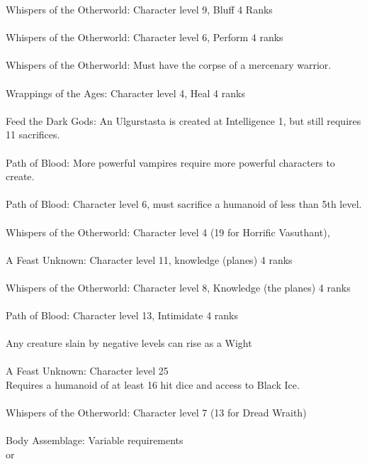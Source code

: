 \begin{multicols}{2}
\begin{small}
Whispers of the Otherworld: Character level 9, Bluff 4 Ranks\\
\\
Whispers of the Otherworld: Character level 6, Perform 4 ranks\\
\\
Whispers of the Otherworld: Must have the corpse of a mercenary warrior.\\
\\
Wrappings of the Ages: Character level 4, Heal 4 ranks\\
\\
Feed the Dark Gods: An Ulgurstasta is created at Intelligence 1, but still requires 11 sacrifices.\\
\\
Path of Blood: More powerful vampires require more powerful characters to create.\\
\\
Path of Blood: Character level 6, must sacrifice a humanoid of less than 5th level.\\
\\
Whispers of the Otherworld: Character level 4 (19 for Horrific Vasuthant), \\
\\
A Feast Unknown: Character level 11, knowledge (planes) 4 ranks\\
\\
Whispers of the Otherworld: Character level 8, Knowledge (the planes) 4 ranks\\
\\
Path of Blood: Character level 13, Intimidate 4 ranks\\
\\
Any creature slain by negative levels can rise as a Wight\\
\\
A Feast Unknown: Character level 25\\
Requires a humanoid of at least 16 hit dice and access to Black Ice.\\
\\
Whispers of the Otherworld: Character level 7 (13 for Dread Wraith)\\
\\
Body Assemblage: Variable requirements\\
or \\


\end{small}
\end{multicols}
